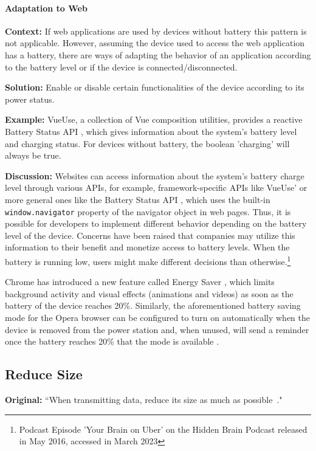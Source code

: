 \paragraph{Adaptation to Web}\mbox{}

\textbf{Context:} If web applications are used by devices without battery this pattern is not applicable. However, assuming the device used to access the web application has a battery, there are ways of adapting the behavior of an application according to the battery level or if the device is connected/disconnected.

\textbf{Solution:} Enable or disable certain functionalities of the device according to its power status.

\textbf{Example:} VueUse, a collection of Vue composition utilities, provides a reactive Battery Status API \cite{vueuse-useBattery}, which gives information about the system's battery level and charging status. For devices without battery, the boolean 'charging' will always be true.

\textbf{Discussion:} Websites can access information about the system's battery charge level through various APIs, for example, framework-specific APIs like VueUse'  or more general ones like the Battery Status API \cite{dev-mozilla-battery-status-api}, which uses the built-in \texttt{window.navigator} property of the navigator object in web pages. Thus, it is possible for developers to implement different behavior depending on the battery level of the device. Concerns have been raised that companies may utilize this information to their benefit and monetize access to battery levels. When the battery is running low, users might make different decisions than otherwise.\footnote{Podcast Episode 'Your Brain on Uber' on the Hidden Brain Podcast released in May 2016, accessed in March 2023}

Chrome has introduced a new feature called Energy Saver \cite{chrome_new_feature}, which limits background activity and visual effects (\eg animations and videos) as soon as the battery of the device reaches 20\%. Similarly, the aforementioned battery saving mode for the Opera browser can be configured to turn on automatically when the device is removed from the power station and, when unused, will send a reminder once the battery reaches 20\% that the mode is available \cite{opera-battery-saver}.

\subsection{Reduce Size} \label{sec:patterns-ReduceSize}
\textbf{Original:} ``When transmitting data, reduce its size as much as possible~\cite{cruz2019catalog}."

